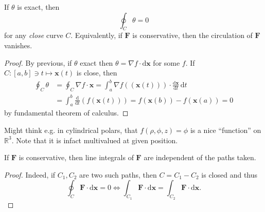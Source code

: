 \begin{proposition}
    If $ \theta $ is exact, then 
    \[
        \oint_{C} \theta =0
    \]
    for any \textit{close} curve $C$. Equivalently, if $\mathbf{F}$ is conservative, then the circulation of $\mathbf{F}$ vanishes.
\end{proposition}
\begin{proof}
    By previous, if $ \theta $ exact then $ \theta=\nabla f \cdot \mathrm{d}\mathbf{x} $ for some $f$. If $ C: [a,b]\ni t \mapsto \mathbf{x}(t) $ is close, then 
    \begin{align*}
        \oint_{C}\theta &= \oint_{C}\nabla f\cdot \mathbf{x} = \int_{a}^{b} \nabla f((\mathbf{x}(t))) \cdot \frac{\mathrm{d}\mathbf{x}}{\mathrm{d}t}  \,\mathrm{d}t \\
       & = \int_{a}^{b} \frac{\mathrm{d}}{\mathrm{d}t}\left( f(\mathbf{x}(t)) \right)  = f(\mathbf{x}(b))-f(\mathbf{x}(a)) = 0
    \end{align*}
    by fundamental theorem of calculus.
\end{proof}
\begin{note}
    Might think e.g. in cylindrical polars, that $f(\rho,\phi,z)=\phi$ is a nice ``function'' on $ \mathbb{R}^{3} $. Note that it is infact multivalued at given position.
\end{note}

\begin{corollary}
    If $\mathbf{F}$ is conservative, then line integrals of $\mathbf{F}$ are independent of the paths taken.
\end{corollary}
\begin{proof}
    Indeed, if $ C_1,C_2 $ are two such paths, then $ C=C_1-C_2 $ is closed and thus
    \[
        \oint_{C}\mathbf{F}\cdot\mathrm{d}\mathbf{x} = 0 \Longleftrightarrow \int_{C_1} \mathbf{F} \cdot\mathrm{d}\mathbf{x} = \int_{C_2} \mathbf{F} \cdot\mathrm{d}\mathbf{x}.
    \]
\end{proof}

